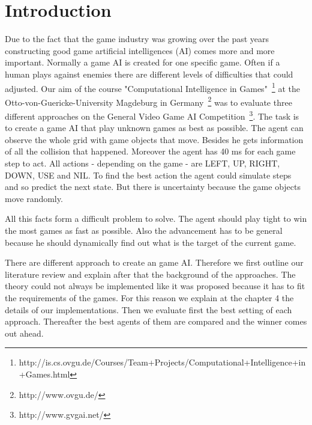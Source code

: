\section{Introduction} 
\label{sec:intro}


Due to the fact that the game industry was growing over the past years~\cite{gartner}
constructing good game artificial intelligences (AI) comes more and more important.
Normally a game AI is created for one specific game. Often if a human plays against
enemies there are different levels of difficulties that could adjusted.
Our aim of the course "Computational Intelligence in Games"~\footnote{http://is.cs.ovgu.de/Courses/Team+Projects/Computational+Intelligence+in+Games.html} at the Otto-von-Guericke-University Magdeburg in Germany~\footnote{http://www.ovgu.de/} was
to evaluate three different approaches on the General Video Game AI Competition~\footnote{http://www.gvgai.net/}.
The task is to create a game AI that play unknown games as best as possible. The agent can observe the
whole grid with game objects that move. Besides he gets information of all the collision that happened.
Moreover the agent has 40 ms for each game step to act. All actions - depending on the game - are  LEFT, UP, RIGHT, DOWN, USE and NIL.
To find the best action the agent could simulate steps and so predict the next state.
But there is uncertainty because the game objects move randomly.

All this facts form a difficult problem to solve. The agent should play tight to win the most games as fast as possible. 
Also the advancement has to be general because he should dynamically find out what is the target of the current game.

There are different approach to create an game AI. Therefore we first outline our literature review and explain after that
the background of the approaches. The theory could not always be implemented like it was proposed because it has to
fit the requirements of the games. For this reason we explain at the chapter 4 the details of our implementations.
Then we evaluate first the best setting of each approach. Thereafter the best agents of them are compared and the
winner comes out ahead.








